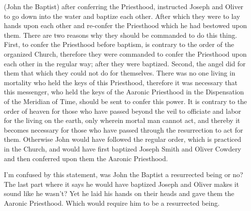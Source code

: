 \begin{displayquote}
(John the Baptist) after conferring the Priesthood, instructed Joseph and Oliver to 
go down into the water and baptize each other. After which they were to lay hands 
upon each other and re-confer the Priesthood which he had bestowed upon them. There 
are two reasons why they should be commanded to do this thing. First, to confer the 
Priesthood before baptism, is contrary to the order of the organized Church, 
therefore they were commanded to confer the Priesthood upon each other in the regular 
way; after they were baptized. Second, the angel did for them that which they could 
not do for themselves. There was no one living in mortality who held the keys of this 
Priesthood, therefore it was necessary that this messenger, who held the keys of the 
Aaronic Priesthood in the Dispensation of the Meridian of Time, should be sent to 
confer this power. It is contrary to the order of heaven for those who have passed 
beyond the veil to officiate and labor for the living on the earth, only wherein 
mortal man cannot act, and thereby it becomes necessary for those who have passed 
through the resurrection to act for them. Otherwise John would have followed the 
regular order, which is practiced in the Church, and would have first baptized 
Joseph Smith and Oliver Cowdery and then conferred upon them the Aaronic 
Priesthood.\cite{essentials}
\end{displayquote}

I'm confused by this statement, was John the Baptist a resurrected being or no? The
last part where it says he would have baptized Joseph and Oliver makes it sound like
he wasn't? Yet he laid his hands on their heads and gave them the Aaronic Priesthood.
Which would require him to be a resurrected being.